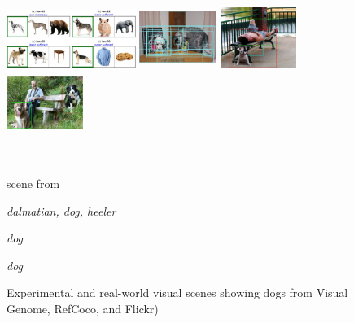 \documentclass[runningheads]{llncs}
\begin{document}
\begin{figure}[t]
	\begin{center}
		\begin{minipage}{.35\textwidth}
			\includegraphics[width=4.2cm]{fig/graffig.jpg}
		\end{minipage}
		\begin{minipage}{.2\textwidth}
			\includegraphics[height=2cm,width=2.5cm]{fig/visual_genome_dogs.png}
		\end{minipage}
	\begin{minipage}{.2\textwidth}
		\includegraphics[height=2cm,width=2.5cm]{fig/flickr_1003163366_dog_boxes_crop.jpg}
	\end{minipage}
	\begin{minipage}{.2\textwidth}
		\includegraphics[height=2cm,width=2.5cm]{fig/refcoco_2400_dog_boxes_crop.jpg}
	\end{minipage}\vspace{-0cm}\\
\begin{minipage}{.35\textwidth}
	\tiny scene from  \cite{graf2016animal}
\end{minipage}
\begin{minipage}{.2\textwidth}
	\tiny
	{\textsl{dalmatian, dog, heeler}}
\end{minipage}
\begin{minipage}{.2\textwidth}
	\textsl{\tiny dog}
\end{minipage}
\begin{minipage}{.2\textwidth}
	\tiny \textsl{dog}
\end{minipage}
	\end{center}
		\vspace{-0.8cm}

	\caption{Experimental and real-world visual scenes showing dogs from Visual Genome, RefCoco, and Flickr)}
	\label{fig:graf_genome}
		\vspace{-0.5cm}

\end{figure}
\end{document}
